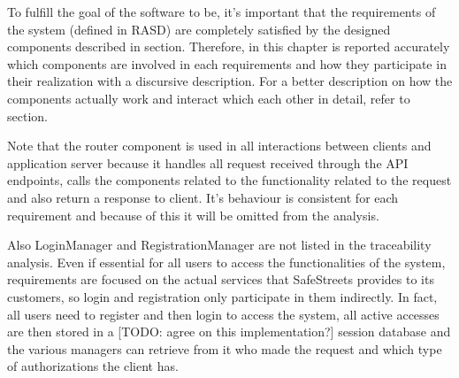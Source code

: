 To fulfill the goal of the software to be, it's important that the requirements of the system (defined in RASD) are completely satisfied by the designed components described in \hyperref[sec:components]{\color{blue}{component view}} section. Therefore, in this chapter is reported accurately which components are involved in each requirements and how they participate in their realization with a discursive description. For a better description on how the components actually work and interact which each other in detail, refer to \hyperref[sec:components]{\color{blue}{component view}} section.

Note that the router component is used in all interactions between clients and application server because it handles all request received through the API endpoints, calls the components related to the functionality related to the request and also return a response to client. It's behaviour is consistent for each requirement and because of this it will be omitted from the analysis.

Also LoginManager and RegistrationManager are not listed in the traceability analysis. Even if essential for all users to access the functionalities of the system, requirements are focused on the actual services that SafeStreets provides to its customers, so login and registration only participate in them indirectly. In fact, all users need to register and then login to access the system, all active accesses are then stored in a [TODO: agree on this implementation?] session database and the various managers can retrieve from it who made the request and which type of authorizations the client has.

